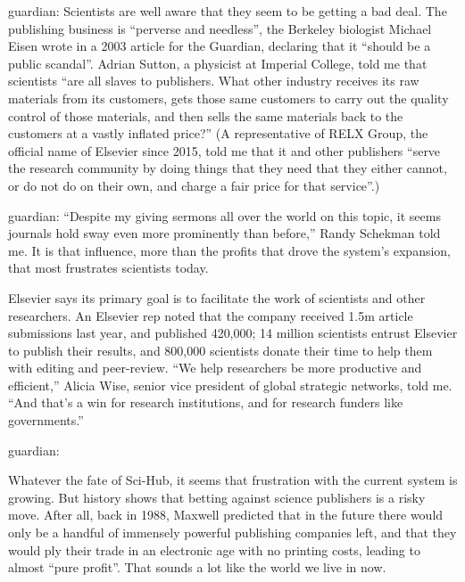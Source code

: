 \documentclass[10pt,compress,serif]{beamer}
\begin{document}
\begin{frame}[t]%
 \vskip1cm%

 guardian:
 Scientists are well aware that they seem to be getting a bad deal. The publishing business is “perverse and needless”, the Berkeley biologist Michael Eisen wrote in a 2003 article for the Guardian, declaring that it “should be a public scandal”. Adrian Sutton, a physicist at Imperial College, told me that scientists “are all slaves to publishers. What other industry receives its raw materials from its customers, gets those same customers to carry out the quality control of those materials, and then sells the same materials back to the customers at a vastly inflated price?” (A representative of RELX Group, the official name of Elsevier since 2015, told me that it and other publishers “serve the research community by doing things that they need that they either cannot, or do not do on their own, and charge a fair price for that service”.)


 guardian:
 “Despite my giving sermons all over the world on this topic, it seems journals hold sway even more prominently than before,” Randy Schekman told me. It is that influence, more than the profits that drove the system’s expansion, that most frustrates scientists today.

 Elsevier says its primary goal is to facilitate the work of scientists and other researchers. An Elsevier rep noted that the company received 1.5m article submissions last year, and published 420,000; 14 million scientists entrust Elsevier to publish their results, and 800,000 scientists donate their time to help them with editing and peer-review. “We help researchers be more productive and efficient,” Alicia Wise, senior vice president of global strategic networks, told me. “And that’s a win for research institutions, and for research funders like governments.”


 guardian:

 Whatever the fate of Sci-Hub, it seems that frustration with the current system is growing. But history shows that betting against science publishers is a risky move. After all, back in 1988, Maxwell predicted that in the future there would only be a handful of immensely powerful publishing companies left, and that they would ply their trade in an electronic age with no printing costs, leading to almost “pure profit”. That sounds a lot like the world we live in now.
\end{frame}
\end{document}
